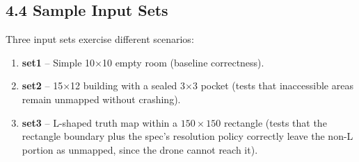 \documentclass[12pt,a4paper]{article}
\begin{document}
\subsection{4.4 Sample Input Sets}

Three input sets exercise different scenarios:

\begin{enumerate}[nosep]
\item \textbf{set1} -- Simple 10$\times$10 empty room (baseline correctness).
\item \textbf{set2} -- 15$\times$12 building with a sealed 3$\times$3 pocket
      (tests that inaccessible areas remain unmapped without crashing).
\item \textbf{set3} -- L-shaped truth map within a $150\times150$ rectangle
      (tests that the rectangle boundary plus the spec's resolution policy
      correctly leave the non-L portion as unmapped, since the drone cannot
      reach it).
\end{enumerate}
\end{document}
